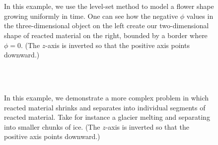 \documentclass[oneside,12pt,final]{/Applications/TeX/packages/ucthesis-CA2012}
\begin{document}
\begin{mainmatter}
\begin{figure} [!h]
\centering
{} \quad
{} \\
 \quad
{}\\
 \quad
{}
\caption[Interface as an Isocontour of a Higher-Order Dimensional Level-Set Function]{In this example, we use the level-set method to model a flower shape growing uniformly in time. One can see how the negative $\phi$ values in the three-dimensional object on the left create our two-dimensional shape of reacted material on the right, bounded by a border where $\phi = 0$. (The $z$-axis is inverted so that the positive axis points downward.)}
\label{fig:level_set_1}
\end{figure}

\begin{figure} [!h]
\centering
{} \quad
{} \\
 \quad
{}\\
 \quad
{}
\caption[Level-Set Handling Complex Topological Changes]{In this example, we demonstrate a more complex problem in which reacted material shrinks and separates into individual segments of reacted material. Take for instance a glacier melting and separating into smaller chunks of ice. (The $z$-axis is inverted so that the positive axis points downward.)\\}
\label{fig:level_set_2}
\end{figure}


\end{mainmatter}
\end{document}
